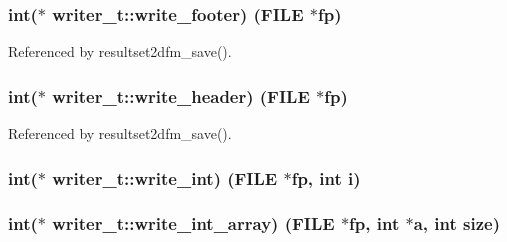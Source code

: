 \subsubsection[{\texorpdfstring{write\+\_\+footer}{write_footer}}]{\setlength{\rightskip}{0pt plus 5cm}int($\ast$ writer\+\_\+t\+::write\+\_\+footer) (F\+I\+LE $\ast$fp)}\hypertarget{structwriter__t_a2f47df34e4cd72fa49d7b7a2a1bc7f15}{}\label{structwriter__t_a2f47df34e4cd72fa49d7b7a2a1bc7f15}


Referenced by resultset2dfm\+\_\+save().

\subsubsection[{\texorpdfstring{write\+\_\+header}{write_header}}]{\setlength{\rightskip}{0pt plus 5cm}int($\ast$ writer\+\_\+t\+::write\+\_\+header) (F\+I\+LE $\ast$fp)}\hypertarget{structwriter__t_a589ac59557ca8095d3d1c87cbf7f2538}{}\label{structwriter__t_a589ac59557ca8095d3d1c87cbf7f2538}


Referenced by resultset2dfm\+\_\+save().

\subsubsection[{\texorpdfstring{write\+\_\+int}{write_int}}]{\setlength{\rightskip}{0pt plus 5cm}int($\ast$ writer\+\_\+t\+::write\+\_\+int) (F\+I\+LE $\ast$fp, int i)}\hypertarget{structwriter__t_a689a36091a9036a26b8559081afeb675}{}\label{structwriter__t_a689a36091a9036a26b8559081afeb675}
\subsubsection[{\texorpdfstring{write\+\_\+int\+\_\+array}{write_int_array}}]{\setlength{\rightskip}{0pt plus 5cm}int($\ast$ writer\+\_\+t\+::write\+\_\+int\+\_\+array) (F\+I\+LE $\ast$fp, int $\ast$a, int size)}\hypertarget{structwriter__t_a3e0f5204d947a6e79652eed3cb50e320}{}\label{structwriter__t_a3e0f5204d947a6e79652eed3cb50e320}
